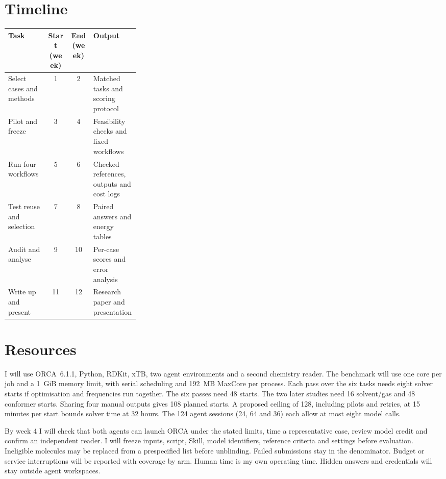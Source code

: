 \documentclass[12pt,a4paper]{article}
\begin{document}
\section{Timeline}
\begin{tabularx}{\linewidth}{|>{\raggedright\arraybackslash}p{0.30\linewidth}|c|c|Y|}
\hline
{}\textbf{Task} & \textbf{Start (week)} & \textbf{End (week)} & \textbf{Output} \\ \hline
Select cases and methods & 1 & 2 & Matched tasks and scoring protocol \\ \hline
Pilot and freeze & 3 & 4 & Feasibility checks and fixed workflows \\ \hline
Run four workflows & 5 & 6 & Checked references, outputs and cost logs \\ \hline
Test reuse and selection & 7 & 8 & Paired answers and energy tables \\ \hline
Audit and analyse & 9 & 10 & Per-case scores and error analysis \\ \hline
Write up and present & 11 & 12 & Research paper and presentation \\ \hline
\end{tabularx}

\section{Resources}
I will use ORCA~6.1.1, Python, RDKit, xTB, two agent environments and a
second chemistry reader. The benchmark will use one core per job and a
1~GiB memory limit, with serial scheduling and 192~MB MaxCore per process.
Each pass over the six tasks needs eight solver starts if optimisation and
frequencies run together. The six passes need 48 starts. The two later
studies need 16 solvent/gas and 48 conformer starts. Sharing four manual
outputs gives 108 planned starts. A proposed ceiling of 128, including pilots
and retries, at 15 minutes per start bounds solver time at 32 hours.
The 124 agent sessions (24, 64 and 36) each allow at most eight model calls.

By week 4 I will check that both agents can launch ORCA under the stated
limits, time a representative case, review model credit and confirm an
independent reader. I will freeze inputs, script, Skill, model identifiers,
reference criteria and settings before evaluation. Ineligible molecules may
be replaced from a prespecified list before unblinding. Failed submissions
stay in the denominator. Budget or service interruptions will be reported
with coverage by arm. Human time is my own operating time. Hidden answers
and credentials will stay outside agent workspaces.
\end{document}
